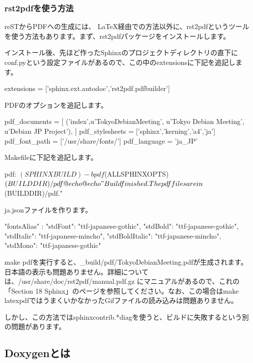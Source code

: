 \documentclass[mingoth,a4paper]{jsarticle}
\begin{document}
\subsubsection{rst2pdfを使う方法}
reSTからPDFへの生成には、 \LaTeX 経由での方法以外に、rst2pdfというツールを使う方法もあります。まず、rst2pdfパッケージをインストールします。


インストール後、先ほど作ったSphinxのプロジェクトディレクトリの直下にconf.pyという設定ファイルがあるので、この中のextensionsに下記を追記します。
\begin{commandline}
extensions = ['sphinx.ext.autodoc','rst2pdf.pdfbuilder']
\end{commandline}

PDFのオプションを追記します。
\begin{commandline}
pdf_documents = [
        ('index',u'TokyoDebianMeeting', u'Tokyo Debian Meeting', u'Debian JP Project'),
]
pdf_stylesheets = ['sphinx','kerning','a4','ja']
pdf_font_path = ['/usr/share/fonts/']
pdf_language = 'ja_JP'
\end{commandline}

Makefileに下記を追記します。
\begin{commandline}
pdf:
        $(SPHINXBUILD) -b pdf $(ALLSPHINXOPTS) $(BUILDDIR)/pdf
        @echo
        @echo "Build finished. The pdf files are in $(BUILDDIR)/pdf."
\end{commandline}

ja.jsonファイルを作ります。
\begin{commandline}
{
  "fontsAlias" : {
    "stdFont": "ttf-japanese-gothic",
    "stdBold": "ttf-japanese-gothic",
    "stdItalic": "ttf-japanese-mincho",
    "stdBoldItalic": "ttf-japanese-mincho",
    "stdMono": "ttf-japanese-gothic"
  }
}
\end{commandline}

make pdfを実行すると、\_build/pdf/TokyoDebianMeeting.pdfが生成されます。日本語の表示も問題ありません。詳細については、/usr/share/doc/rst2pdf/manual.pdf.gz にマニュアルがあるので、これの「Section 18 Sphinx」のページを参照してください。なお、この場合はmake latexpdfではうまくいかなかったGifファイルの読み込みは問題ありません。

しかし、この方法ではsphinxcontrib.*diagを使うと、ビルドに失敗するという別の問題があります。

\subsection{Doxygenとは}
\end{document}
